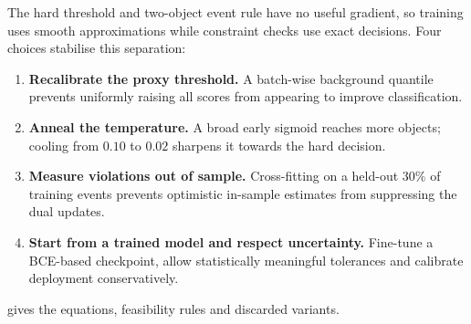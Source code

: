 The hard threshold and two-object event rule have no useful gradient, so training uses smooth approximations while constraint checks use exact decisions. Four choices stabilise this separation:
\begin{enumerate}[label=(\roman*),itemsep=1pt,topsep=2pt]
  \item \textbf{Recalibrate the proxy threshold.} A batch-wise background quantile prevents uniformly raising all scores from appearing to improve classification.
  \item \textbf{Anneal the temperature.} A broad early sigmoid reaches more objects; cooling from $0.10$ to $0.02$ sharpens it towards the hard decision.
  \item \textbf{Measure violations out of sample.} Cross-fitting on a held-out $30\%$ of training events prevents optimistic in-sample estimates from suppressing the dual updates.
  \item \textbf{Start from a trained model and respect uncertainty.} Fine-tune a BCE-based checkpoint, allow statistically meaningful tolerances and calibrate deployment conservatively.
\end{enumerate}
 gives the equations, feasibility rules and discarded variants.
